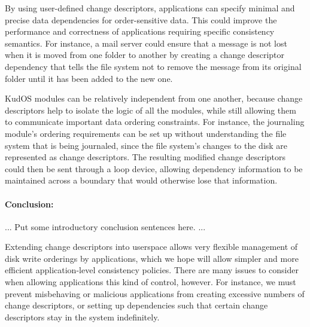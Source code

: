 \documentclass[12pt]{article}
\newcommand{\preparagraphspacing}{\vspace{-0.2in}}
\begin{document}
By using user-defined change descriptors, applications can specify minimal and
precise data dependencies for order-sensitive data. This could improve the
performance and correctness of applications requiring specific consistency
semantics. For instance, a mail server could ensure that a message is not lost
when it is moved from one folder to another by creating a change descriptor
dependency that tells the file system not to remove the message from its
original folder until it has been added to the new one.


KudOS modules can be relatively independent from one another, because change
descriptors help to isolate the logic of all the modules, while still allowing
them to communicate important data ordering constraints. For instance, the
journaling module's ordering requirements can be set up without understanding
the file system that is being journaled, since the file system's changes to the
disk are represented as change descriptors. The resulting modified change
descriptors could then be sent through a loop device, allowing dependency
information to be maintained across a boundary that would otherwise lose that
information. 

\preparagraphspacing
\paragraph{Conclusion:}

... Put some introductory conclusion sentences here. ...

Extending change descriptors into userspace allows very flexible management of
disk write orderings by applications, which we hope will allow simpler and more
efficient application-level consistency policies. There are many issues to
consider when allowing applications this kind of control, however. For instance,
we must prevent misbehaving or malicious applications from creating excessive
numbers of change descriptors, or setting up dependencies such that certain
change descriptors stay in the system indefinitely.
\end{document}

